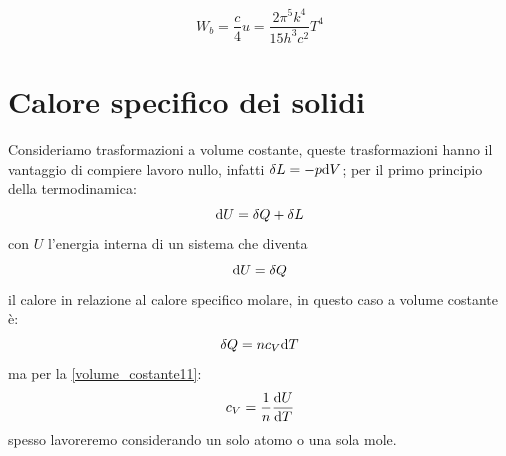 \begin{equation}
W_b = \frac{c}{4} u = \frac{2\pi^5 k^4}{15h^3c^2}T^4
\end{equation}

\begin{figure}
	\centering
\end{figure}




\chapter{Calore specifico dei solidi}
\minitoc
Consideriamo trasformazioni a volume costante, queste trasformazioni hanno il vantaggio di compiere lavoro nullo, infatti $\delta L=-p\mathrm{d} V$; per il primo principio della termodinamica:
\begin{equation}
	\mathrm{d} U=\delta Q+\delta L
\end{equation}
con $U$ l'energia interna di un sistema che diventa
\begin{equation}
	\mathrm{d} U=\delta Q
	\label{volume_costante11}
\end{equation}
il calore in relazione al calore specifico molare, in questo caso a volume costante è:
\begin{equation}
	\delta Q=nc_V\mathrm{d} T
\end{equation}
ma per la \eqref{volume_costante11}:
\begin{equation}
	c_V=\frac{1}{n}\frac{\mathrm{d} U}{\mathrm{d} T}
	\label{eq:def_cv}
\end{equation}
spesso lavoreremo considerando un solo atomo o una sola mole.
